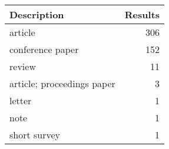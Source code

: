 
\begin{tabular}{lr}
\toprule
Description & Results\\
\midrule
article & 306\\
conference paper & 152\\
review & 11\\
article; proceedings paper & 3\\
letter & 1\\
\addlinespace
note & 1\\
short survey & 1\\
\bottomrule
\end{tabular}